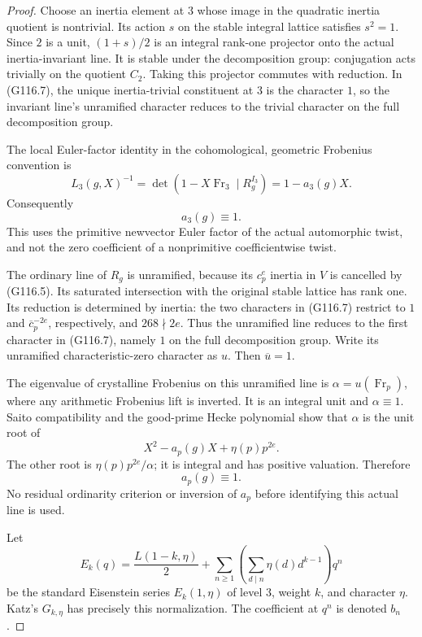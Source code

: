 \begin{proof}
Choose an inertia element at \(3\) whose image in the quadratic
inertia quotient is nontrivial.  Its action \(s\) on the stable
integral lattice satisfies \(s^2=1\).  Since \(2\) is a unit,
\((1+s)/2\) is an integral rank-one projector onto the actual
inertia-invariant line.  It is stable under the decomposition
group: conjugation acts trivially on the quotient \(C_2\).
Taking this projector commutes with reduction.  In (G116.7),
the unique inertia-trivial constituent at \(3\) is the character
\(1\), so the invariant line's unramified character reduces to
the trivial character on the full decomposition group.

The local Euler-factor identity in the cohomological, geometric
Frobenius convention is
\[
 L_3(g,X)^{-1}
   =\det(1-X\operatorname{Fr}_3\mid R_g^{I_3})
   =1-a_3(g)X.
 \tag{G116.9}
\]
Consequently
\[
                             a_3(g)\equiv1.
 \tag{G116.10}
\]
This uses the primitive newvector Euler factor of the actual
automorphic twist, and not the zero coefficient of a
nonprimitive coefficientwise twist.

The ordinary line of \(R_g\) is unramified, because its
\(c_p^e\) inertia in \(V\) is cancelled by (G116.5).
Its saturated intersection with the original stable lattice
has rank one.  Its reduction is determined by inertia:
the two characters in (G116.7) restrict to
\(1\) and \(\overline c_p^{-2e}\), respectively, and
\(268\nmid2e\).  Thus the unramified line reduces to the first
character in (G116.7), namely \(1\) on the full decomposition
group.  Write its unramified characteristic-zero character as
\(u\).  Then \(\overline u=1\).

The eigenvalue of crystalline Frobenius on this unramified line
is \(\alpha=u(\operatorname{Fr}_p)\), where any arithmetic
Frobenius lift is inverted.  It is an integral unit and
\(\alpha\equiv1\).  Saito compatibility and the good-prime
Hecke polynomial show that \(\alpha\) is the unit root of
\[
                        X^2-a_p(g)X+\eta(p)p^{2e}.
 \tag{G116.11}
\]
The other root is \(\eta(p)p^{2e}/\alpha\); it is integral and
has positive valuation.  Therefore
\[
                             a_p(g)\equiv1.
 \tag{G116.12}
\]
No residual ordinarity criterion or inversion of \(a_p\)
before identifying this actual line is used.

Let
\[
 E_k(q)=\frac{L(1-k,\eta)}2+
       \sum_{n\ge1}\left(\sum_{d\mid n}\eta(d)d^{k-1}\right)q^n
 \tag{G116.13}
\]
be the standard Eisenstein series \(E_k(1,\eta)\) of level
\(3\), weight \(k\), and character \(\eta\).
Katz's \(G_{k,\eta}\) has precisely this normalization.
The coefficient at \(q^n\) is denoted \(b_n\).


\end{proof}
